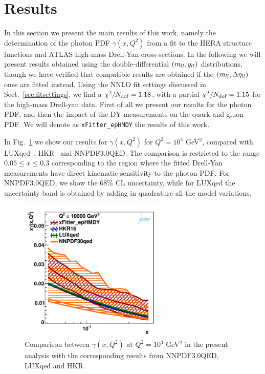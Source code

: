\section{Results}
\label{sec:results}

In this section we present the main results of this work, namely the determination
of the photon PDF $\gamma(x,Q^2)$ from a fit to the HERA structure functions
and ATLAS high-mass Drell-Yan cross-sections.
%
In the following we will present results obtained using the
double-differential $\left( m_{ll},y_{ll}\right)$ distributions, though
we have verified that compatible results
are obtained if the $\left( m_{ll},\Delta\eta_{ll}\right)$ ones are fitted
instead.
%
Using the NNLO fit settings discussed in Sect.~\ref{sec:fitsettings}, we find
a $\chi^{2}/N_{\rm dof} = 1.18$,
with a partial $\chi^2/N_{\rm dof} = 1.15$ for the high-mass Drell-yan data.
%
First of all we present our results for the photon PDF, and then the impact
of the DY measurements on the quark and gluon PDF.
%
We will denote as {\tt xFitter\_epHMDY} the results of this work.

In Fig.~\ref{photon_zoom} we show our results
for $\gamma(x,Q^2)$ for $Q^2=10^4$ GeV$^2$,
compared with LUXqed~\cite{Manohar:2016nzj}, HKR~\cite{Harland-Lang:2016apc}
and NNPDF3.0QED.
%
The comparison is restricted to the range $0.05 \le x \le 0.3$ corresponding
to the region where the fitted Drell-Yan measurements have direct kinematic sensitivity
to the photon PDF.
%
For NNPDF3.0QED, we show the 68\% CL uncertainty, while for LUXqed the uncertainty band
is obtained by adding in quadrature all the model variations.

\begin{figure}[h]
\includegraphics[width=7cm]{figs/photon_comp_10000.pdf} 
\caption{Comparison between $\gamma(x,Q^2)$ at $Q^2=10^4$ GeV$^2$ in the present
  analysis with the corresponding results from NNPDF3.0QED, LUXqed and HKR.}
\label{photon_zoom}
\end{figure}

